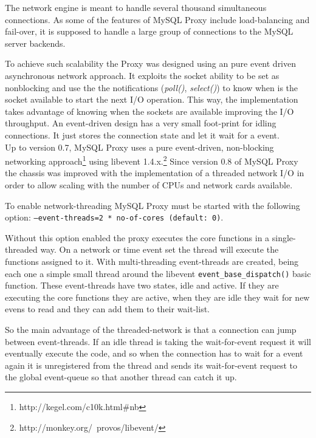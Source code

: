 The network engine is meant to handle several thousand simultaneous connections. As some of the features of MySQL Proxy include load-balancing and fail-over, it is supposed to handle a large group of connections to the MySQL server backends.

To achieve such scalability the Proxy was designed using an pure event driven asynchronous network approach. It exploits the socket ability to be set as nonblocking and use the the notifications (\textit{poll()}, \textit{select()}) to know when is the socket available to start the next I/O operation. This way, the implementation takes advantage of knowing when the sockets are available improving the I/O throughput. An event-driven design has a very small foot-print for idling connections. It just stores the connection state and let it wait for a event.\\


Up to version 0.7, MySQL Proxy uses a pure event-driven, non-blocking networking approach\footnote{http://kegel.com/c10k.html\#nb} using libevent 1.4.x.\footnote{http://monkey.org/~provos/libevent/} Since version 0.8 of MySQL Proxy the chassis was improved with the implementation of a threaded network I/O in order to allow scaling with the number of 
CPUs and network cards available.

To enable network-threading MySQL Proxy must be started with the following option: \texttt{--event-threads={2 * no-of-cores} (default: 0)}.

Without this option enabled the proxy executes the core functions in a single-threaded way. On a network or time event set the thread will execute the functions assigned to it. With multi-threading event-threads are created, being each one a simple small thread around the libevent \texttt{event\_base\_dispatch()} basic function.
These event-threads have two states, idle and active. If they are executing the core functions they are active, when they are idle they wait for new evens to read and they can add them to their wait-list.

So the main advantage of the threaded-network is that a connection can jump between event-threads. If an idle thread is taking the wait-for-event request it will eventually execute the code, and so when the connection has to wait for a event again it is unregistered from the thread and sends its wait-for-event request to the global event-queue so that another thread can catch it up.

